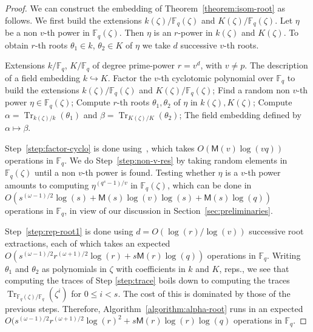 \documentclass{mcom-l}
\theoremstyle{plain}
\theoremstyle{definition}
\DeclareMathOperator{\trace}{Tr} %
\newcommand{\F}{\ensuremath{\mathbb{F}}}
\newcommand{\MM}{\ensuremath{\mathsf{M}}}
\newcounter{algorithm}
\begin{document}
\begin{proof}
We can construct the embedding of Theorem~\ref{theorem:isom-root} as
follows. We first build the extensions $k(\zeta) / \F_q(\zeta)$ and
$K(\zeta)/\F_q(\zeta)$. Let $\eta$ be a non $v$-th power in
$\F_q(\zeta)$.  Then $\eta$ is an $r$-power in $k(\zeta)$ and
$K(\zeta)$. To obtain $r$-th roots $\theta_1\in k$, $\theta_2\in K$ of
$\eta$ we take $d$ successive $v$-th roots.

\begin{algorithm}
	\label{algorithm:alpha-root}
	\begin{algorithmic}[1]
		\REQUIRE Extensions $k / \F_q$, $K/\F_q$ of degree prime-power $r = v^d$, with $v\ne p$.
		\ENSURE The description of a field embedding $k\hookrightarrow K$.
		\STATE\label{step:factor-cyclo} Factor the $v$-th cyclotomic polynomial over $\F_q$ to 
		build the extensions $k(\zeta) / \F_q(\zeta)$ and $K(\zeta)/\F_q(\zeta)$;
		\STATE\label{step:non-v-res} Find a random non $v$-th power $\eta \in \F_q(\zeta)$;
		\STATE\label{step:rep-root1} Compute $r$-th roots $\theta_1,\theta_2$ of $\eta$ in $k(\zeta),K(\zeta)$;
		\STATE\label{step:trace} Compute $\alpha = \trace_{k(\zeta) / k}(\theta_1)$ and $\beta = 
		\trace_{K(\zeta) / 
		K}(\theta_2)$;
		\RETURN The field embedding defined by $\alpha\mapsto\beta$.
	\end{algorithmic}
\end{algorithm}

Step~\ref{step:factor-cyclo} is done using~\cite[Theorem~9]{shoup94},
which takes $O(\MM(v)\log(vq))$ operations in $\F_q$. We do
Step~\ref{step:non-v-res} by taking random elements in $\F_q(\zeta)$
until a non $v$-th power is found. Testing whether $\eta$ is a $v$-th power
amounts to computing $\eta^{(q^s-1)/v}$ in $\F_q(\zeta)$, which
can be done in $O(s^{(\omega-1)/2}\log(s) + \MM(s)\log(v)\log(s) +
\MM(s)\log(q))$ operations in $\F_q$, in view of our discussion in
Section~\ref{sec:preliminaries}.

Step~\ref{step:rep-root1} is done using $d = O(\log(r) / \log(v))$ successive root extractions, 
each of which takes an expected $O(s^{(\omega-1)/2}r^{(\omega+1)/2}\log(r) + s\MM(r)\log(q))$
operations in $\F_q$. Writing $\theta_1$ and $\theta_2$ as polynomials in $\zeta$ with coefficients 
in $k$ and $K$, reps., we see that computing the traces of Step \ref{step:trace} boils down to 
computing the traces $\trace_{\F_q(\zeta) / \F_q}(\zeta^i)$ for $0 \le i < s$. The cost of this is 
dominated by those of the previous steps. Therefore, Algorithm~\ref{algorithm:alpha-root} runs in 
an expected $O(s^{(\omega-1)/2}r^{(\omega+1)/2}\log(r)^2 + s\MM(r)\log(r)\log(q)$ operations in 
$\F_q$.
\end{proof}
\end{document}
